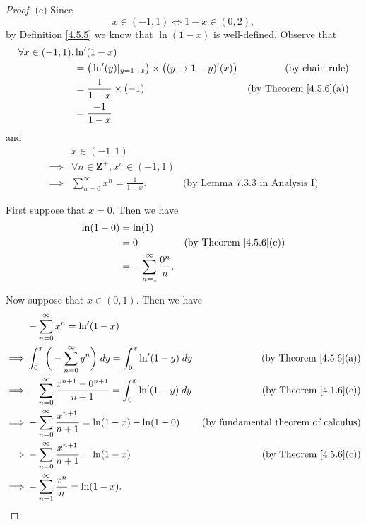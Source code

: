 \begin{proof}{(e)}
    Since
    \[
        x \in (-1, 1) \iff 1 - x \in (0, 2),
    \]
    by Definition \ref{4.5.5} we know that \(\ln(1 - x)\) is well-defined.
    Observe that
    \begin{align*}
        \forall x \in (-1, 1), & \ln'(1 - x)                                                                                                  \\
                               & = \big(\ln'(y)|_{y = 1 - x}\big) \times \big((y \mapsto 1 - y)'(x)\big) & \text{(by chain rule)}             \\
                               & = \frac{1}{1 - x} \times (-1)                                           & \text{(by Theorem \ref{4.5.6}(a))} \\
                               & = \frac{-1}{1 - x}
    \end{align*}
    and
    \begin{align*}
                 & x \in (-1, 1)                                                                       \\
        \implies & \forall n \in \mathbf{Z}^+, x^n \in (-1, 1)                                         \\
        \implies & \sum_{n = 0}^\infty x^n = \frac{1}{1 - x}.  & \text{(by Lemma 7.3.3 in Analysis I)}
    \end{align*}

    First suppose that \(x = 0\).
    Then we have
    \begin{align*}
        \ln(1 - 0) & = \ln(1)                                                                    \\
                   & = 0                                    & \text{(by Theorem \ref{4.5.6}(c))} \\
                   & = - \sum_{n = 1}^\infty \frac{0^n}{n}.
    \end{align*}

    Now suppose that \(x \in (0, 1)\).
    Then we have
    \begin{align*}
                 & - \sum_{n = 0}^\infty x^n = \ln'(1 - x)                                                                                              \\
        \implies & \int_0^x \bigg(- \sum_{n = 0}^\infty y^n\bigg) \; dy = \int_0^x \ln'(1 - y) \; dy      & \text{(by Theorem \ref{4.5.6}(a))}          \\
        \implies & - \sum_{n = 0}^\infty \frac{x^{n + 1} - 0^{n + 1}}{n + 1} = \int_0^x \ln'(1 - y) \; dy & \text{(by Theorem \ref{4.1.6}(e))}          \\
        \implies & - \sum_{n = 0}^\infty \frac{x^{n + 1}}{n + 1} = \ln(1 - x) - \ln(1 - 0)                & \text{(by fundamental theorem of calculus)} \\
        \implies & - \sum_{n = 0}^\infty \frac{x^{n + 1}}{n + 1} = \ln(1 - x)                             & \text{(by Theorem \ref{4.5.6}(c))}          \\
        \implies & - \sum_{n = 1}^\infty \frac{x^n}{n} = \ln(1 - x).
    \end{align*}


\end{proof}

